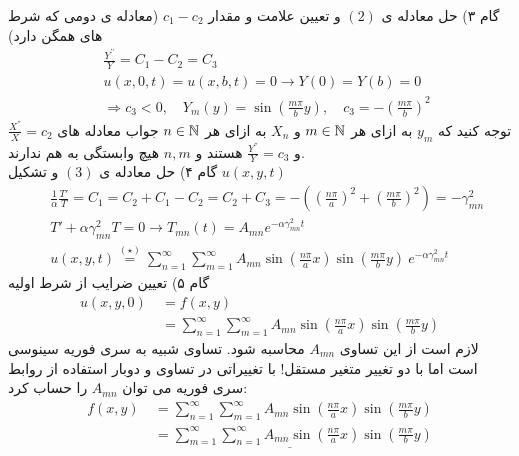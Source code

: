 گام ۳) حل معادله ی
$(2)$
و تعیین علامت و مقدار 
$c_1-c_2$
(معادله ی دومی که شرط های همگن دارد)
\begin{equation*}
	\begin{aligned}
		{} &\
		\frac {Y^{\prime\prime}}{Y}=C_{1}-C_2=C_{3}
		\\ &\
		u(x,0,t)=u(x,b,t)=0 \rightarrow Y(0)=Y(b)=0
		\\ &\
		\Rightarrow c_{3}<0 ,\quad Y_{m}(y) = \sin \left(\frac{m \pi}{b} y\right) ,\quad c_{3}=-\left(\frac{m\pi}{b}\right)^{2}
	\end{aligned}
\end{equation*}
توجه کنید که 
$y_m$
به ازای هر 
$m\in\mathbb{N}$
و
$X_n$
به ازای هر 
$n\in\mathbb{N}$
جواب معادله های 
$\frac{X^{''}}{X}=c_2$
و
$\frac{Y^{''}}{Y}=c_3$
هستند و 
$n,m$
هیچ وابستگی به هم ندارند.\\
گام ۴) حل معادله ی
$(3)$
و تشکیل
$u(x,y,t)$
\begin{equation*}
	\begin{aligned}
		{} &\
		\frac{1}{\alpha}\frac{T'}{T}= C_{1}=C_{2} +C_{1}-C_{2}= C_{2}+C_{3}=-\left(\left(\frac{n \pi}{a}\right)^{2}+\left(\frac{m \pi}{b}\right)^{2}\right)=-\gamma_{mn}^{2}
		\\ &\
		T'+\alpha \gamma_{m n}^{2}T=0 \rightarrow T_{mn}(t)=A_{mn}e^{-\alpha \gamma_{m n}^{2} t}
		\\ &\
		u(x, y, t) \overset{(\star)}{=}\sum_{n=1}^{\infty}\sum_{m=1}^{\infty} A_{mn} \sin \left(\frac{n \pi}{a} x\right) \sin \left(\frac{m \pi }{b}y\right)\  e^{-\alpha \gamma_{m n}^{2} t}
	\end{aligned}
\end{equation*}
گام ۵) تعیین ضرایب از شرط اولیه
\begin{equation*}
	\begin{aligned}
		u(x, y, 0)  {}&\
		=f(x,y)
		\\ &\
		=\sum_{n=1}^{\infty}\sum_{m=1}^{\infty} A_{mn} \sin \left(\frac{n \pi}{a} x\right) \sin \left(\frac{m \pi }{b}y\right)
	\end{aligned}
\end{equation*}
لازم است از این تساوی 
$A_{mn}$
محاسبه شود. تساوی شبیه به سری فوریه سینوسی است اما با دو تغییر متغیر مستقل! با تغییراتی در تساوی و دوبار استفاده از روابط سری فوریه می توان
$A_{mn}$
را حساب کرد:
\begin{equation*}
	\begin{aligned}
		f(x,y) {} &\
		=\sum_{n=1}^{\infty}\sum_{m=1}^{\infty} A_{mn} \sin \left(\frac{n \pi}{a} x\right) \sin \left(\frac{m \pi }{b}y\right)
		\\ &\
		=\sum_{m=1}^{\infty}\underline{\sum_{n=1}^{\infty} A_{mn} \sin \left(\frac{n \pi}{a} x\right) }\sin \left(\frac{m \pi }{b}y\right)
	\end{aligned}
\end{equation*}
